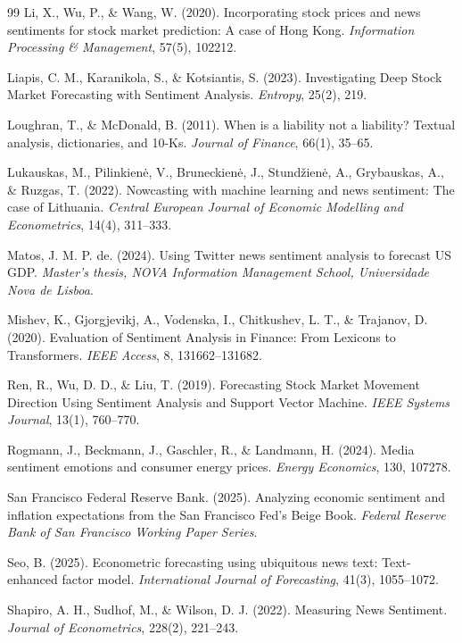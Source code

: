 \documentclass[11pt,twocolumn]{article}
\begin{document}
\begin{thebibliography}{99}
 Li, X., Wu, P., \& Wang, W. (2020). Incorporating stock prices and news sentiments for stock market prediction: A case of Hong Kong. \textit{Information Processing \& Management}, 57(5), 102212.

 Liapis, C. M., Karanikola, S., \& Kotsiantis, S. (2023). Investigating Deep Stock Market Forecasting with Sentiment Analysis. \textit{Entropy}, 25(2), 219.

 Loughran, T., \& McDonald, B. (2011). When is a liability not a liability? Textual analysis, dictionaries, and 10-Ks. \textit{Journal of Finance}, 66(1), 35--65.

 Lukauskas, M., Pilinkien\.{e}, V., Bruneckien\.{e}, J., Stund\v{z}ien\.{e}, A., Grybauskas, A., \& Ruzgas, T. (2022). Nowcasting with machine learning and news sentiment: The case of Lithuania. \textit{Central European Journal of Economic Modelling and Econometrics}, 14(4), 311--333.

 Matos, J. M. P. de. (2024). Using Twitter news sentiment analysis to forecast US GDP. \textit{Master's thesis, NOVA Information Management School, Universidade Nova de Lisboa}.

 Mishev, K., Gjorgjevikj, A., Vodenska, I., Chitkushev, L. T., \& Trajanov, D. (2020). Evaluation of Sentiment Analysis in Finance: From Lexicons to Transformers. \textit{IEEE Access}, 8, 131662--131682.

 Ren, R., Wu, D. D., \& Liu, T. (2019). Forecasting Stock Market Movement Direction Using Sentiment Analysis and Support Vector Machine. \textit{IEEE Systems Journal}, 13(1), 760--770.

 Rogmann, J., Beckmann, J., Gaschler, R., \& Landmann, H. (2024). Media sentiment emotions and consumer energy prices. \textit{Energy Economics}, 130, 107278.

 San Francisco Federal Reserve Bank. (2025). Analyzing economic sentiment and inflation expectations from the San Francisco Fed's Beige Book. \textit{Federal Reserve Bank of San Francisco Working Paper Series}.

 Seo, B. (2025). Econometric forecasting using ubiquitous news text: Text-enhanced factor model. \textit{International Journal of Forecasting}, 41(3), 1055--1072.

 Shapiro, A. H., Sudhof, M., \& Wilson, D. J. (2022). Measuring News Sentiment. \textit{Journal of Econometrics}, 228(2), 221--243.


\end{thebibliography}
\end{document}
